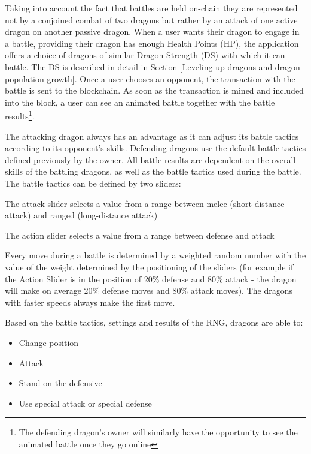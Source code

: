 \documentclass[12pt]{article}
\begin{document}
Taking into account the fact that battles are held on-chain they are represented not by a conjoined combat of two dragons but rather by an attack of one active dragon on another passive dragon. When a user wants their dragon to engage in a battle, providing their dragon has enough Health Points (HP), the application offers a choice of dragons of similar Dragon Strength (DS) with which it can battle. The DS is described in detail in Section \ref{Leveling up dragons and dragon population growth}. Once a user chooses an opponent, the transaction with the battle is sent to the blockchain. As soon as the transaction is mined and included into the block, a user can see an animated battle together with the battle results\footnote{The defending dragon’s owner will similarly have the opportunity to see the animated battle once they go online}.\par

The attacking dragon always has an advantage as it can adjust its battle tactics according to its opponent’s skills. Defending dragons use the default battle tactics defined previously by the owner. All battle results are dependent on the overall skills of the battling dragons, as well as the battle tactics used during the battle. The battle tactics can be defined by two sliders:


\begin{itemize}
  \begin{samepage}
    \item The attack slider selects a value from a range between melee (short-distance attack) and ranged (long-distance attack)
    \item The action slider selects a value from a range between defense and attack
   \end{samepage}
\end{itemize}

Every move during a battle is determined by a weighted random number with the value of the weight determined by the positioning of the sliders (for example if the Action Slider is in the position of 20$\%$  defense and 80$\%$  attack - the dragon will make on average 20$\%$  defense moves and 80$\%$  attack moves). The dragons with faster speeds always make the first move.\par

\begin{samepage}
 Based on the battle tactics, settings and results of the RNG, dragons are able to:\par
 \begin{itemize}
    \item Change position
          \item Attack
          \item Stand on the defensive
          \item Use special attack or special defense
  \end{itemize}
\end{samepage}
\end{document}

